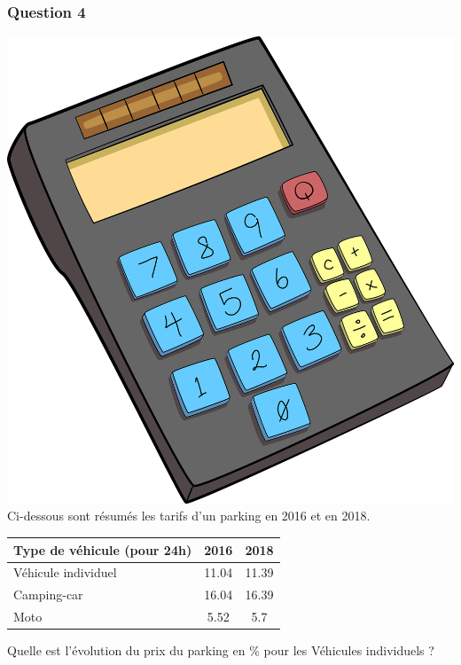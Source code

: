 \documentclass[15pt, mathserif]{beamer}
\begin{document}
\begin{frame} 
	\frametitle{Question 4}
\includegraphics[scale=0.01]{calculatrice}Ci-dessous sont résumés les tarifs d'un parking en 2016 et en 2018. 
 \begin{center} 
 \begin{tabular}{|C{3cm}|c|c|} 
 \hline 
 Type de véhicule (pour 24h) & 2016 & 2018 \\ 
 \hline 
 Véhicule individuel & 11.04& 11.39\\ 
 \hline 
 Camping-car & 16.04& 16.39\\ 
 \hline 
 Moto & 5.52& 5.7\\ 
 \hline 
 \end{tabular} 
\end{center} 
  Quelle est l'évolution du prix du parking en \% pour les Véhicules individuels ? \end{frame}
\end{document}
